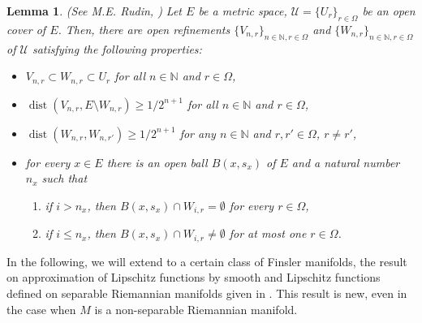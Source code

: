 \documentclass[11pt]{amsart}
\newtheorem{lem}[thm]{Lemma}
\numberwithin{equation}{section}
\begin{document}
\begin{lem}(See M.E. Rudin, \cite{Rudin}) \label{Rudin}
Let $E$ be a metric space, $\mathcal{U}=\{U_r\}_{r\in\Omega}$ be an open cover of $E$. Then, there are open
refinements $\{V_{n,r}\}_{n\in\mathbb{N},r\in\Omega}$ and $\{W_{n,r}\}_{n\in\mathbb{N},r\in\Omega}$ of $\mathcal{U}$ satisfying  the following properties:
\begin{itemize}
\item[(i)] $V_{n,r}\subset W_{n,r}\subset U_r$ for all $n\in\mathbb{N}$ and $r\in \Omega$,
\item[(ii)] ${\operatorname{dist}}(V_{n,r},E\setminus W_{n,r})\geq  1/2^{n+1}$ for all $n\in\mathbb{N}$ and $r\in\Omega$,
\item[(iii)] ${\operatorname{dist}}(W_{n,r},W_{n,r'})\geq 1/2^{n+1}$ for any $n\in\mathbb{N}$ and $r,r'\in\Omega$, $r\not=r'$,
\item[(iv)] for every $x\in E$ there is an open ball $B(x,s_x)$ of $E$ and a natural number $n_x$ such that
     \begin{enumerate}
         \item[(a)] if $i>n_x$, then $B(x,s_x)\cap W_{i,r}=\emptyset$ for every $r\in\Omega$,
         \item[(b)] if $i\leq n_x$, then $B(x,s_x)\cap W_{i,r}\neq\emptyset$ for at most one $r\in\Omega$.
     \end{enumerate}
\end{itemize}
\end{lem}

In the following, we will extend to a certain class of Finsler manifolds, the result on approximation of Lipschitz functions by smooth and Lipschitz  functions defined on separable Riemannian manifolds given in  \cite{AzFeMeRa}. This result is new, even in the case when $M$ is a non-separable Riemannian manifold.
\end{document}

